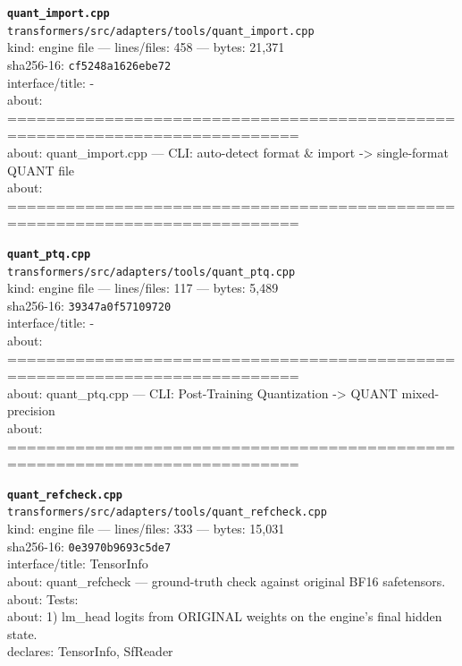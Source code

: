 \noindent\textbf{\texttt{quant\_import.cpp}}\\
\texttt{transformers/src/adapters/tools/quant\_import.cpp}\\
kind: engine file --- lines/files: 458 --- bytes: 21,371\\
sha256-16: \texttt{cf5248a1626ebe72}\\
interface/title: -\\
about: ============================================================================\\
about: quant\_import.cpp — CLI: auto-detect format \& import -> single-format QUANT file\\
about: ============================================================================\\
\vspace*{6.0pt}

\noindent\textbf{\texttt{quant\_ptq.cpp}}\\
\texttt{transformers/src/adapters/tools/quant\_ptq.cpp}\\
kind: engine file --- lines/files: 117 --- bytes: 5,489\\
sha256-16: \texttt{39347a0f57109720}\\
interface/title: -\\
about: ============================================================================\\
about: quant\_ptq.cpp — CLI: Post-Training Quantization -> QUANT mixed-precision\\
about: ============================================================================\\
\vspace*{6.0pt}
\newpage

\noindent\textbf{\texttt{quant\_refcheck.cpp}}\\
\texttt{transformers/src/adapters/tools/quant\_refcheck.cpp}\\
kind: engine file --- lines/files: 333 --- bytes: 15,031\\
sha256-16: \texttt{0e3970b9693c5de7}\\
interface/title: TensorInfo\\
about: quant\_refcheck — ground-truth check against original BF16 safetensors.\\
about: Tests:\\
about: 1) lm\_head logits from ORIGINAL weights on the engine's final hidden state.\\
declares: TensorInfo, SfReader\\
\vspace*{6.0pt}

